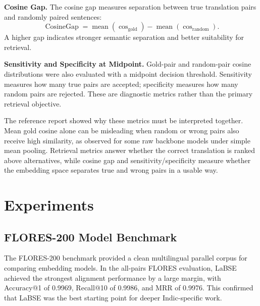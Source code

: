 \documentclass[12pt, a4paper]{article}
\begin{document}
\textbf{Cosine Gap.}
The cosine gap measures separation between true translation pairs and randomly paired sentences:
\[
  \operatorname{CosineGap}
  =
  \operatorname{mean}(\cos_{\text{gold}})
  -
  \operatorname{mean}(\cos_{\text{random}}).
\]
A higher gap indicates stronger semantic separation and better suitability for retrieval.

\textbf{Sensitivity and Specificity at Midpoint.}
Gold-pair and random-pair cosine distributions were also evaluated with a midpoint decision threshold. Sensitivity measures how many true pairs are accepted; specificity measures how many random pairs are rejected. These are diagnostic metrics rather than the primary retrieval objective.

The reference report showed why these metrics must be interpreted together. Mean gold cosine alone can be misleading when random or wrong pairs also receive high similarity, as observed for some raw backbone models under simple mean pooling. Retrieval metrics answer whether the correct translation is ranked above alternatives, while cosine gap and sensitivity/specificity measure whether the embedding space separates true and wrong pairs in a usable way.

\newpage

\section{Experiments}

\subsection{FLORES-200 Model Benchmark}

The FLORES-200 benchmark provided a clean multilingual parallel corpus for comparing embedding models. In the all-pairs FLORES evaluation, LaBSE achieved the strongest alignment performance by a large margin, with Accuracy@1 of 0.9969, Recall@10 of 0.9986, and MRR of 0.9976. This confirmed that LaBSE was the best starting point for deeper Indic-specific work.
\end{document}
